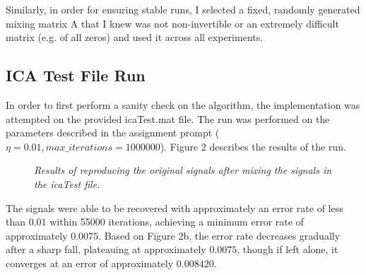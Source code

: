 \documentclass{article} %
\begin{document}
Similarly, in order for ensuring stable runs, I selected a fixed, randomly generated mixing matrix A that I knew was not non-invertible or an extremely difficult matrix (e.g. of all zeros) and used it across all experiments.

\subsection{ICA Test File Run}

In order to first perform a sanity check on the algorithm, the implementation was attempted on the provided icaTest.mat file. The run was performed on the parameters described in the assignment prompt (\(\eta=0.01,max\_iterations=1000000\)). Figure 2 describes the results of the run.

\begin{figure}[h]%
	\centering
    	\hfill%
    \caption{\textit{Results of reproducing the original signals after mixing the signals in the icaTest file.}}
    \label{fig:default}
\end{figure}

The signals were able to be recovered with approximately an error rate of less than \(0.01\) within 55000 iterations, achieving a minimum error rate of approximately \(0.0075\). Based on Figure 2b, the error rate decreases gradually after a sharp fall, plateauing at approximately \(0.0075\), though if left alone, it converges at an error of approximately \(0.008420\).
\end{document}
